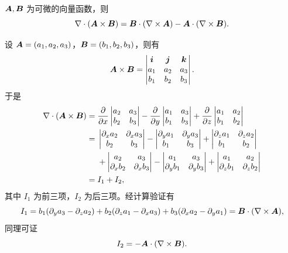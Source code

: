 \begin{xexample}[26.1.3]
$\bm{A},\bm{B}$ 为可微的向量函数，则
\[
  \nabla\cdot(\bm{A}\times\bm{B})
  =\bm{B}\cdot(\nabla\times\bm{A})-\bm{A}\cdot(\nabla\times\bm{B}).
\]
\end{xexample}
\begin{xproof}
设 $\bm{A}=(a_1,a_2,a_3)$，$\bm{B}=(b_1,b_2,b_3)$，则有
\[
  \bm{A}\times\bm{B}
  =\begin{vmatrix}
    \bm{i}&\bm{j}&\bm{k}\\
    a_1&a_2&a_3\\
    b_1&b_2&b_3
  \end{vmatrix}.
\]
于是
\begin{align*}
  \nabla\cdot(\bm{A}\times\bm{B})
  ={}&\frac{\partial}{\partial x}\begin{vmatrix}a_2&a_3\\b_2&b_3\end{vmatrix}
  -\frac{\partial}{\partial y}\begin{vmatrix}a_1&a_3\\b_1&b_3\end{vmatrix}
  +\frac{\partial}{\partial z}\begin{vmatrix}a_1&a_2\\b_1&b_2\end{vmatrix}\\
  ={}&\begin{vmatrix}\partial_xa_2&\partial_xa_3\\b_2&b_3\end{vmatrix}
  -\begin{vmatrix}\partial_ya_1&\partial_ya_3\\b_1&b_3\end{vmatrix}
  +\begin{vmatrix}\partial_za_1&\partial_za_2\\b_1&b_2\end{vmatrix}\\
  &+\begin{vmatrix}a_2&a_3\\\partial_xb_2&\partial_xb_3\end{vmatrix}
  -\begin{vmatrix}a_1&a_3\\\partial_yb_1&\partial_yb_3\end{vmatrix}
  +\begin{vmatrix}a_1&a_2\\\partial_zb_1&\partial_zb_2\end{vmatrix}\\
  ={}&I_1+I_2,
\end{align*}
其中 $I_1$ 为前三项，$I_2$ 为后三项。经计算验证有
\[
  I_1=b_1(\partial_ya_3-\partial_za_2)+b_2(\partial_za_1-\partial_xa_3)+b_3(\partial_xa_2-\partial_ya_1)
  =\bm{B}\cdot(\nabla\times\bm{A}),
\]
同理可证
\[
  I_2=-\bm{A}\cdot(\nabla\times\bm{B}).
\]
\end{xproof}

